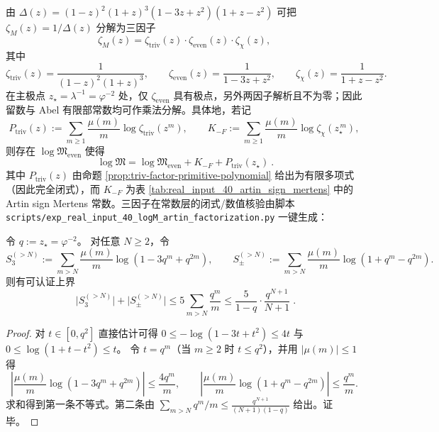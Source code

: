 \begin{remark}\label{rem:real-input-40-logM-artin-factorization}
由
\(
\Delta(z)=(1-z)^2(1+z)^3(1-3z+z^2)(1+z-z^2)
\)
可把 \(\zeta_M(z)=1/\Delta(z)\) 分解为三因子
\[
\zeta_M(z)=\zeta_{\mathrm{triv}}(z)\cdot \zeta_{\mathrm{even}}(z)\cdot \zeta_{\chi}(z),
\]
其中
\[
\zeta_{\mathrm{triv}}(z)=\frac{1}{(1-z)^2(1+z)^3},\qquad
\zeta_{\mathrm{even}}(z)=\frac{1}{1-3z+z^2},\qquad
\zeta_{\chi}(z)=\frac{1}{1+z-z^2}.
\]
在主极点 \(z_\star=\lambda^{-1}=\varphi^{-2}\) 处，仅 \(\zeta_{\mathrm{even}}\) 具有极点，另外两因子解析且不为零；因此留数与 Abel 有限部常数均可作乘法分解。具体地，若记
\[
P_{\mathrm{triv}}(z):=\sum_{m\ge 1}\frac{\mu(m)}{m}\log\zeta_{\mathrm{triv}}(z^m),\qquad
K_{-F}:=\sum_{m\ge 1}\frac{\mu(m)}{m}\log\zeta_{\chi}(z_\star^{\,m}),
\]
则存在 \(\log\mathfrak{M}_{\mathrm{even}}\) 使得
\[
\boxed{\ \log\mathfrak{M}=\log\mathfrak{M}_{\mathrm{even}}+K_{-F}+P_{\mathrm{triv}}(z_\star)\ }.
\]
其中 \(P_{\mathrm{triv}}(z)\) 由命题 \ref{prop:triv-factor-primitive-polynomial} 给出为有限多项式（因此完全闭式），而 \(K_{-F}\) 为表 \ref{tab:real_input_40_artin_sign_mertens} 中的 Artin sign Mertens 常数。三因子在常数层的闭式/数值核验由脚本 \texttt{scripts/exp\_real\_input\_40\_logM\_artin\_factorization.py} 一键生成：


\end{remark}

\begin{corollary}[二核级数的可认证尾界]\label{cor:real-input-40-mertens-two-series-tail}
令 \(q:=z_\star=\varphi^{-2}\)。
对任意 \(N\ge 2\)，令
\[
S_3^{(>N)}:=\sum_{m>N}\frac{\mu(m)}{m}\log(1-3q^m+q^{2m}),
\qquad
S_\pm^{(>N)}:=\sum_{m>N}\frac{\mu(m)}{m}\log(1+q^m-q^{2m}).
\]
则有可认证上界
\[
\boxed{\;
\bigl|S_3^{(>N)}\bigr|+\bigl|S_\pm^{(>N)}\bigr|
\le
5\sum_{m>N}\frac{q^m}{m}
\le
\frac{5}{1-q}\cdot\frac{q^{N+1}}{N+1}\; }.
\]
\end{corollary}
\begin{proof}
对 \(t\in[0,q^2]\) 直接估计可得
\(
0\le -\log(1-3t+t^2)\le 4t
\)
与
\(
0\le \log(1+t-t^2)\le t
\)。
令 \(t=q^m\)（当 \(m\ge 2\) 时 \(t\le q^2\)），并用 \(|\mu(m)|\le 1\) 得
\[
\left|\frac{\mu(m)}{m}\log(1-3q^m+q^{2m})\right|\le \frac{4q^m}{m},\qquad
\left|\frac{\mu(m)}{m}\log(1+q^m-q^{2m})\right|\le \frac{q^m}{m}.
\]
求和得到第一条不等式。第二条由
\(
\sum_{m>N}q^m/m\le \frac{q^{N+1}}{(N+1)(1-q)}
\)
给出。证毕。
\end{proof}

